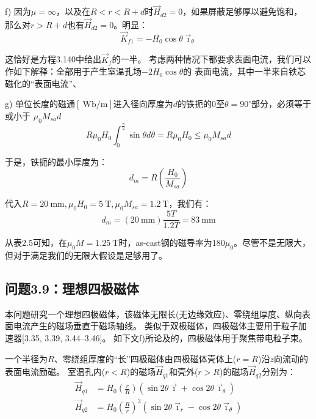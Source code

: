 f) 因为$\mu=\infty$，以及在$R< r< R+d$时$\vec{H}_{d2}=0$，如果屏蔽足够厚以避免饱和，
那么对$r>R+d$也有$\vec{H}_{d2}=0$。明显：
\begin{equation*}
\vec{K}_{f1}=-H_{0}\cos\theta\vec{\imath}_{\theta}\tag{S8.5}%
\end{equation*}

这恰好是方程3.140中给出$\vec{K}_f$的一半。
考虑两种情况下都要求表面电流，我们可以作如下解释：全部用于产生室温孔场$-2H_0\cos\theta$的
表面电流，其中一半来自铁芯磁化的“表面电流”、

g) 单位长度的磁通$[\ \mathrm{Wb/m}]$进入径向厚度为$d$的铁扼的0至$\theta=90^\circ$部分，必须等于或小于
$\mu_0 M_{sa}d$
\begin{equation*}
R\mu_{0}H_{0}\int_{0}^{\frac{\pi}{2}}\sin\theta d\theta=R\mu_{0}H_{0}\leq\mu_{0}M_{sa}d\tag{S8.6}%
\end{equation*}

于是，铁扼的最小厚度为：
\begin{equation*}
d_{m}=R(\frac{H_{0}}{M_{sa}})\tag{3.144}%
\end{equation*}

代入$R=20\ \mathrm{mm}, \mu_0 H_0=5\ \mathrm{T}, \mu_0 M_{sa}=1.2\ \mathrm{T}$，我们有：
\begin{equation*}
d_{m}=(20\ \mathrm{mm})\frac{5T}{1.2T}=83\ \mathrm{mm} 
\end{equation*}

从表2.5可知，在$\mu_0 M=1.25\ \mathrm{T}$时，as-cast钢的磁导率为$180\mu_0$。尽管不是无限大，
但对于满足我们的无限大假设是足够用了。

\subsection{问题3.9：理想四极磁体}
本问题研究一个理想四极磁体，该磁体无限长(无边缘效应)、零绕组厚度、纵向表面电流产生的磁场垂直于磁场轴线。
类似于双极磁体，四极磁体主要用于粒子加速器[3.35, 3.39, 3.44–3.46]。
如下文f)所论及的，四极磁体用于聚焦带电粒子束。

一个半径为$R$、零绕组厚度的“长”四极磁体由四极磁体壳体上($r=R$)沿$z$向流动的表面电流励磁。
室温孔内($r<R$)的磁场$\vec{H}_{q1}$和壳外($r>R$)的磁场$\vec{H}_{q2}$分别为：
\begin{subequations}
	\begin{align}
\vec{H}_{q1}&=H_{0}\left(\frac{r}{R}\right)(\sin 2\theta\vec{\imath}+\cos 2\theta\vec{\imath}_{\theta})\\%
\vec{H}_{q2}&=H_{0}\left(\frac{R}{r}\right)^{3}(\sin 2\theta\vec{\imath}_{r}-\cos 2\theta\vec{\imath}_{\theta})%
	\end{align}
\end{subequations}

